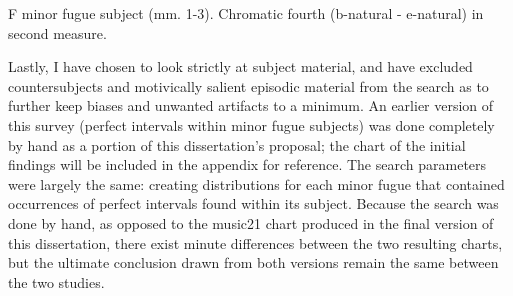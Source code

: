 \begin{Example}[H]
\vspace{1.5em}
    \centering
    \caption[F minor fugue subject (mm. 1-3). ]{ F minor fugue subject (mm. 1-3). Chromatic fourth (b-natural - e-natural) in second measure.}
\end{Example}    
    Lastly, I have chosen to look strictly at subject material, and have
excluded countersubjects and motivically salient episodic material from
the search as to further keep biases and unwanted artifacts to a
minimum. An earlier version of this survey (perfect intervals within
minor fugue subjects) was done completely by hand as a portion of this
dissertation's proposal; the chart of the initial findings will be
included in the appendix for reference. The search parameters were
largely the same: creating distributions for each minor fugue that
contained occurrences of perfect intervals found within its subject.
Because the search was done by hand, as opposed to the music21 chart
produced in the final version of this dissertation, there exist minute
differences between the two resulting charts, but the ultimate
conclusion drawn from both versions remain the same between the two
studies.

